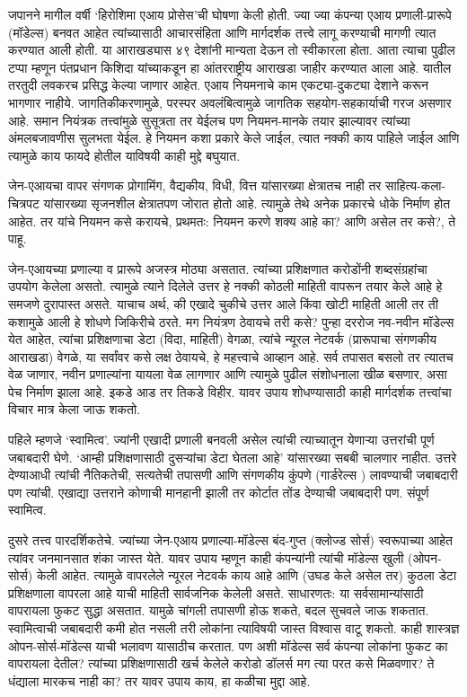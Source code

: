 जपानने मागील वर्षी `हिरोशिमा एआय प्रोसेस'ची घोषणा केली होती. ज्या ज्या कंपन्या एआय प्रणाली-प्रारूपे (मॉडेल्स) बनवत आहेत त्यांच्यासाठी आचारसंहिता आणि मार्गदर्शक तत्त्वे लागू करण्याची मागणी त्यात करण्यात आली होती. या आराखड्यास ४९ देशांनी मान्यता देऊन तो स्वीकारला होता. आता त्याचा पुढील टप्पा म्हणून पंतप्रधान किशिदा यांच्याकडून हा आंतरराष्ट्रीय आराखडा जाहीर करण्यात आला आहे. यातील तरतुदी लवकरच प्रसिद्ध केल्या जाणार आहेत. एआय नियमनाचे काम एकट्या-दुकट्या देशाने करून भागणार नाहीये. जागतिकीकरणामुळे, परस्पर अवलंबित्वामुळे जागतिक सहयोग-सहकार्याची गरज असणार आहे. समान नियंत्रक तत्त्वांमुळे सुसूत्रता तर येईलच पण नियमन-मानके तयार झाल्यावर त्यांच्या अंमलबजावणीस सुलभता येईल. हे नियमन कशा प्रकारे केले जाईल, त्यात नक्की काय पाहिले जाईल आणि त्यामुळे काय फायदे होतील याविषयी काही मुद्दे बघुयात.

जेन-एआयचा वापर संगणक प्रोगामिंग, वैद्यकीय, विधी, वित्त यांसारख्या क्षेत्रातच नाही तर साहित्य-कला-चित्रपट यांसारख्या सृजनशील क्षेत्रातपण जोरात होतो आहे. त्यामुळे तेथे अनेक प्रकारचे धोके निर्माण होत आहेत. तर यांचे नियमन कसे करायचे, प्रथमतः: नियमन करणे शक्य आहे का? आणि असेल तर कसे?, ते पाहू.

जेन-एआयच्या प्रणाल्या व प्रारूपे अजस्त्र मोठ्या असतात. त्यांच्या प्रशिक्षणात करोडोंनी शब्दसंग्रहांचा उपयोग केलेला असतो. त्यामुळे त्याने दिलेले उत्तर हे नक्की कोठली माहिती वापरून तयार केले आहे हे समजणे दुरापास्त असते. याचाच अर्थ, की एखादे चुकीचे उत्तर आले किंवा खोटी माहिती आली तर ती कशामुळे आली हे शोधणे जिकिरीचे ठरते. मग नियंत्रण ठेवायचे तरी कसे? पुन्हा दररोज नव-नवीन मॉडेल्स येत आहेत, त्यांचा प्रशिक्षणाचा डेटा (विदा, माहिती) वेगळा, त्यांचे न्यूरल नेटवर्क (प्रारूपाचा संगणकीय आराखडा) वेगळे, या सर्वांवर कसे लक्ष ठेवायचे, हे महत्त्वाचे  आव्हान आहे. सर्व तपासत बसलो तर त्यातच वेळ जाणार, नवीन प्रणाल्यांना यायला वेळ लागणार आणि त्यामुळे पुढील संशोधनाला खीळ बसणार, असा पेच निर्माण झाला आहे. इकडे आड तर तिकडे विहीर. यावर उपाय शोधण्यासाठी काही मार्गदर्शक तत्त्वांचा विचार मात्र केला जाऊ शकतो.

पहिले म्हणजे `स्वामित्व'. ज्यांनी एखादी प्रणाली बनवली असेल त्यांची त्याच्यातून येणाऱ्या उत्तरांची पूर्ण जबाबदारी घेणे. `आम्ही प्रशिक्षणासाठी दुसऱ्यांचा  डेटा घेतला आहे' यांसारख्या सबबी चालणार नाहीत. उत्तरे देण्याआधी त्यांची नैतिकतेची, सत्यतेची  तपासणी आणि संगणकीय कुंपणे (गार्डरेल्स ) लावण्याची जबाबदारी पण त्यांची. एखाद्या उत्तराने कोणाची मानहानी झाली तर कोर्टात तोंड देण्याची जबाबदारी पण. संपूर्ण स्वामित्व.

दुसरे तत्त्व पारदर्शिकतेचे. ज्यांच्या जेन-एआय प्रणाल्या-मॉडेल्स बंद-गुप्त (क्लोज्ड सोर्स) स्वरूपाच्या आहेत त्यांवर जनमानसात शंका जास्त येते. यावर उपाय म्हणून काही कंपन्यांनी त्यांची मॉडेल्स खुली (ओपन-सोर्स) केली आहेत. त्यामुळे वापरलेले न्यूरल नेटवर्क काय आहे आणि (उघड केले असेल तर) कुठला डेटा प्रशिक्षणाला वापरला आहे याची माहिती सार्वजनिक केलेली असते. साधारणतः: या सर्वसामान्यांसाठी वापरायला फुकट सुद्धा असतात. यामुळे चांगली तपासणी होऊ शकते, बदल सुचवले जाऊ शकतात. स्वामित्वाची जबाबदारी कमी होत नसली तरी लोकांना त्याविषयी जास्त विश्वास वाटू शकतो. काही शास्त्रज्ञ ओपन-सोर्स-मॉडेल्स याची भलावण यासाठीच करतात. पण अशी मॉडेल्स सर्व कंपन्या लोकांना फुकट का वापरायला देतील? त्यांच्या प्रशिक्षणासाठी खर्च केलेले करोडो डॉलर्स मग त्या परत कसे मिळवणार? ते धंद्याला मारकच नाही का? तर यावर उपाय काय, हा कळीचा मुद्दा आहे.

